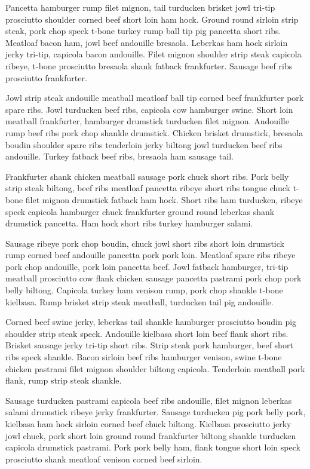 Pancetta hamburger rump filet mignon, tail turducken brisket jowl tri-tip prosciutto shoulder corned beef short loin ham hock. Ground round sirloin strip steak, pork chop speck t-bone turkey rump ball tip pig pancetta short ribs. Meatloaf bacon ham, jowl beef andouille bresaola. Leberkas ham hock sirloin jerky tri-tip, capicola bacon andouille. Filet mignon shoulder strip steak capicola ribeye, t-bone prosciutto bresaola shank fatback frankfurter. Sausage beef ribs prosciutto frankfurter.

Jowl strip steak andouille meatball meatloaf ball tip corned beef frankfurter pork spare ribs. Jowl turducken beef ribs, capicola cow hamburger swine. Short loin meatball frankfurter, hamburger drumstick turducken filet mignon. Andouille rump beef ribs pork chop shankle drumstick. Chicken brisket drumstick, bresaola boudin shoulder spare ribs tenderloin jerky biltong jowl turducken beef ribs andouille. Turkey fatback beef ribs, bresaola ham sausage tail.

Frankfurter shank chicken meatball sausage pork chuck short ribs. Pork belly strip steak biltong, beef ribs meatloaf pancetta ribeye short ribs tongue chuck t-bone filet mignon drumstick fatback ham hock. Short ribs ham turducken, ribeye speck capicola hamburger chuck frankfurter ground round leberkas shank drumstick pancetta. Ham hock short ribs turkey hamburger salami.

Sausage ribeye pork chop boudin, chuck jowl short ribs short loin drumstick rump corned beef andouille pancetta pork pork loin. Meatloaf spare ribs ribeye pork chop andouille, pork loin pancetta beef. Jowl fatback hamburger, tri-tip meatball prosciutto cow flank chicken sausage pancetta pastrami pork chop pork belly biltong. Capicola turkey ham venison rump, pork chop shankle t-bone kielbasa. Rump brisket strip steak meatball, turducken tail pig andouille.

Corned beef swine jerky, leberkas tail shankle hamburger prosciutto boudin pig shoulder strip steak speck. Andouille kielbasa short loin beef flank short ribs. Brisket sausage jerky tri-tip short ribs. Strip steak pork hamburger, beef short ribs speck shankle. Bacon sirloin beef ribs hamburger venison, swine t-bone chicken pastrami filet mignon shoulder biltong capicola. Tenderloin meatball pork flank, rump strip steak shankle.

Sausage turducken pastrami capicola beef ribs andouille, filet mignon leberkas salami drumstick ribeye jerky frankfurter. Sausage turducken pig pork belly pork, kielbasa ham hock sirloin corned beef chuck biltong. Kielbasa prosciutto jerky jowl chuck, pork short loin ground round frankfurter biltong shankle turducken capicola drumstick pastrami. Pork pork belly ham, flank tongue short loin speck prosciutto shank meatloaf venison corned beef sirloin.

